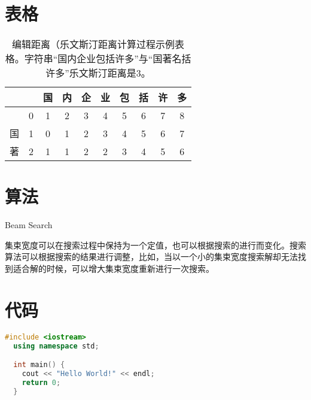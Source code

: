 \documentclass[winfonts, thesis]{njuthesis}
\begin{document}
\section{表格}

\begin{table}[htbp]
  \setlength{\belowcaptionskip}{7pt}
  \centering
  \begin{tabular}{|c|c|c|c|c|c|c|c|c|c|}
    \hline
       &   & 国 & 内 & 企 & 业 & 包 & 括 & 许 & 多 \\
    \hline
       & 0 & 1  & 2  & 3  & 4  & 5  & 6  & 7  & 8  \\
    \hline
    国 & 1 & 0  & 1  & 2  & 3  & 4  & 5  & 6  & 7  \\
    \hline
    著 & 2 & 1  & 1  & 2  & 2  & 3  & 4  & 5  & 6  \\
    \hline
  \end{tabular}
  \vspace{0.2cm}
  \caption{编辑距离（乐文斯汀距离计算过程示例表格。字符串``国内企业包括许多''与``国著名括许多''乐文斯汀距离是3。}\label{table:ld}
\end{table}


\section{算法}

\begin{algorithm}
  \caption{Beam Search}
  \label{alg:beam}
  \begin{algorithmic}[1]
    \ELSE
    \ENDIF
    \ENDWHILE
  \end{algorithmic}
\end{algorithm}

集束宽度可以在搜索过程中保持为一个定值，也可以根据搜索的进行而变化。搜索算法可以根据搜索的结果进行调整，比如，当以一个小的集束宽度搜索解却无法找到适合解的时候，可以增大集束宽度重新进行一次搜索。

\section{代码}

\begin{lstlisting}[language = c++, style=codeBase]
  #include <iostream>
  using namespace std;

  int main() {
    cout << "Hello World!" << endl;
    return 0;
  }
\end{lstlisting}
\end{document}
